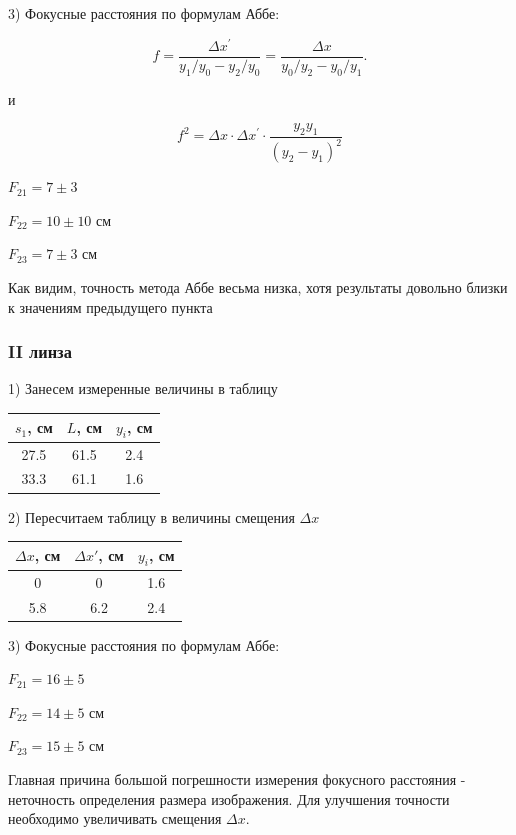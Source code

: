 \documentclass{astroedu-lab}
\begin{document}
\begin{problem}
3) Фокусные расстояния по формулам Аббе:

$$
f=\frac{\Delta x^{\prime}}{y_1 / y_0-y_2 / y_0}=\frac{\Delta x}{y_0 / y_2-y_0 / y_1} .
$$

и

$$
f^2=\Delta x \cdot \Delta x^{\prime} \cdot \frac{y_2 y_1}{\left(y_2-y_1\right)^2}
$$

$F_{21} = 7 \pm 3$

$F_{22} = 10 \pm 10$ см

$F_{23} = 7 \pm 3$ см

Как видим, точность метода Аббе весьма низка, хотя результаты довольно близки к значениям предыдущего пункта

\subsubsection{II линза}

1) Занесем измеренные величины в таблицу

\begin{center}
\begin{tabular}{|c|c|c|}
\hline 
$s_1$, см & $L$, см & $y_i$, см \\
\hline
27.5 & 61.5 & 2.4 \\
33.3 & 61.1 & 1.6 \\
\hline
\end{tabular}
\end{center}

2) Пересчитаем таблицу в величины смещения $\Delta x$

\begin{center}
\begin{tabular}{|c|c|c|}
\hline 
$\Delta x$, см & $\Delta x'$, см & $y_i$, см \\
\hline
0 & 0 & 1.6 \\
5.8 & 6.2 & 2.4 \\
\hline
\end{tabular}
\end{center}

3) Фокусные расстояния по формулам Аббе:

$F_{21} = 16 \pm 5$

$F_{22} = 14 \pm 5$ см

$F_{23} = 15 \pm 5$ см

Главная причина большой погрешности измерения фокусного расстояния - неточность определения размера изображения. Для улучшения точности необходимо увеличивать смещения $\Delta x$.


\end{problem}
\end{document}
